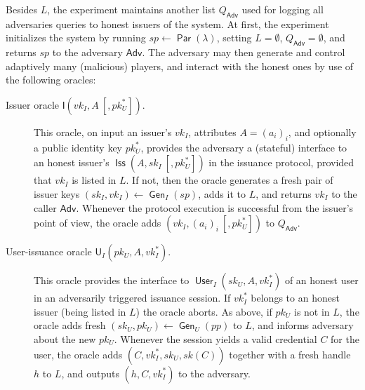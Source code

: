 \documentclass[runningheads]{llncs}
\DeclareMathOperator{\issuer}{\mathsf{Iss}}
\DeclareMathOperator{\user}{\mathsf{User}}
\DeclareMathOperator{\param}{\mathsf{Par}}
\DeclareMathOperator{\gen}{\mathsf{Gen}}
\renewcommand{\adv}{\mathsf{Adv}}
\begin{document}
Besides $L$, the experiment maintains another list $Q_\adv$ used for logging all adversaries queries  to honest issuers of the system. 
At first, the experiment initializes the system by running $sp\leftarrow\param(\lambda)$, setting $L=\emptyset$, $Q_\adv=\emptyset$, and returns $sp$ to the adversary $\adv$.
The adversary may then generate and control adaptively many (malicious) players, and interact with the honest ones by use of the following oracles:
\begin{description}

\item[Issuer oracle {$\mathsf{I}(vk_I, A ~[, pk_U^*])$}.]
This oracle, on input an issuer's $vk_I$, attributes $A=(a_i)_i$, and optionally a public identity key $pk_U^*$, provides the adversary a (stateful) interface to an honest issuer's $\issuer(A, sk_I ~[, pk_U^*])$ in the issuance protocol, provided that $vk_I$ is listed in $L$.
If not, then the oracle generates a fresh pair of issuer keys $(sk_I, vk_I)\leftarrow \gen_I(sp)$, adds it to $L$, and returns  $vk_I$ to the caller $\adv$.
Whenever the protocol execution is successful from the issuer's point of view, the oracle adds $(vk_I, (a_i)_i ~[, pk_U^*])$ to $Q_\adv$. 

\item[User-issuance oracle {$\mathsf{U}_I(pk_U, A, vk_I^*)$}.]
This oracle provides the interface to $\user_I(sk_U, A, vk_I^*)$ of an honest user in an adversarily triggered issuance session.
If $vk_I^*$ belongs to an honest issuer (being listed in $L$) the oracle aborts.
As above, if $pk_U$ is not in $L$, the oracle adds fresh $(sk_U,pk_U)\leftarrow\gen_U(pp)$ to $L$, and informs adversary about the new $pk_U$. 
Whenever the session yields a valid credential $C$ for the user, the oracle adds $(C, vk_I^*, sk_U, sk(C))$ together with a fresh handle $h$ to $L$, and outputs $(h, C,vk_I^*)$ to the adversary.


\end{description}
\end{document}
